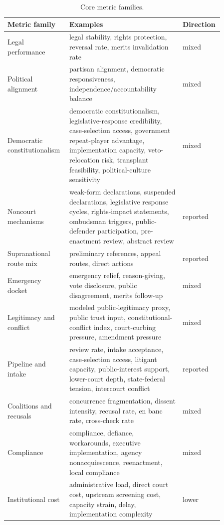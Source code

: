 \documentclass[
  journal=small,
  manuscript=research-article,
  year=2026
]{cup-journal}
\begin{document}
\begin{table}[hbt!]
\centering
\caption{Core metric families.}
\label{tab:metrics}
\begin{tabular}{@{}L{0.23\linewidth}L{0.50\linewidth}L{0.13\linewidth}@{}}
\toprule
Metric family & Examples & Direction \\
\midrule
Legal performance & legal stability, rights protection, reversal rate, merits invalidation rate & mixed \\
Political alignment & partisan alignment, democratic responsiveness, independence/accountability balance & mixed \\
Democratic constitutionalism & democratic constitutionalism, legislative-response credibility, case-selection access, government repeat-player advantage, implementation capacity, veto-relocation risk, transplant feasibility, political-culture sensitivity & mixed \\
Noncourt mechanisms & weak-form declarations, suspended declarations, legislative response cycles, rights-impact statements, ombudsman triggers, public-defender participation, pre-enactment review, abstract review & reported \\
Supranational route mix & preliminary references, appeal routes, direct actions & reported \\
Emergency docket & emergency relief, reason-giving, vote disclosure, public disagreement, merits follow-up & mixed \\
Legitimacy and conflict & modeled public-legitimacy proxy, public trust input, constitutional-conflict index, court-curbing pressure, amendment pressure & mixed \\
Pipeline and intake & review rate, intake acceptance, case-selection access, litigant capacity, public-interest support, lower-court depth, state-federal tension, intercourt conflict & reported \\
Coalitions and recusals & concurrence fragmentation, dissent intensity, recusal rate, en banc rate, cross-check rate & mixed \\
Compliance & compliance, defiance, workarounds, executive implementation, agency nonacquiescence, reenactment, local compliance & mixed \\
Institutional cost & administrative load, direct court cost, upstream screening cost, capacity strain, delay, implementation complexity & lower \\
\bottomrule
\end{tabular}
\end{table}
\end{document}
